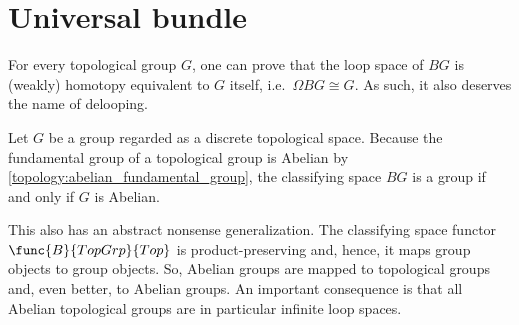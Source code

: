 \section{Universal bundle}

    \begin{property}[Delooping]\label{bundle:delooping}
        For every topological group $G$, one can prove that the loop space of $BG$ is (weakly) homotopy equivalent to $G$ itself, i.e.~$\Omega BG\cong G$. As such, it also deserves the name of delooping.
    \end{property}
    \begin{property}[Groups]
        Let $G$ be a group regarded as a discrete topological space. Because the fundamental group of a topological group is Abelian by \cref{topology:abelian_fundamental_group}, the classifying space $BG$ is a group if and only if $G$ is Abelian.

        This also has an abstract nonsense generalization. The classifying space functor $\func{B}{TopGrp}{Top}$ is product-preserving and, hence, it maps group objects to group objects. So, Abelian groups are mapped to topological groups and, even better, to Abelian groups. An important consequence is that all Abelian topological groups are in particular infinite loop spaces.
    \end{property}

